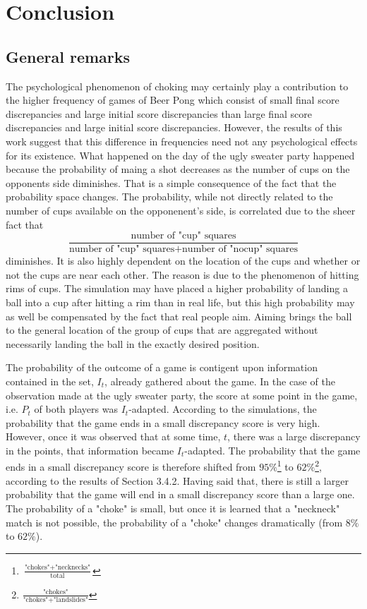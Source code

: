 \documentclass{article}
\begin{document}
\section{Conclusion}
\subsection{General remarks}
The psychological phenomenon of choking may certainly play a contribution to the higher frequency of games of Beer Pong which consist of small final score discrepancies and large initial score discrepancies than large final score discrepancies and large initial score discrepancies. However, the results of this work suggest that this difference in frequencies need not any psychological effects for its existence. What happened on the day of the ugly sweater party happened because the probability of maing a shot decreases as the number of cups on the opponents side diminishes. That is a simple consequence of the fact that the probability space changes. The probability, while not directly related to the number of cups available on the opponenent's side, is correlated due to the sheer fact that
\begin{equation}\label{sheerprob}
\frac{\text{number of "cup" squares}}{\text{number of "cup" squares} + \text{number of "nocup" squares}}
\end{equation}
diminishes. 
It is also highly dependent on the location of the cups and whether or not the cups are near each other. The reason is due to the phenomenon of hitting rims of cups. The simulation may have placed a higher probability of landing a ball into a cup after hitting a rim than in real life, but this high probability may as well be compensated by the fact that real people aim. Aiming brings the ball to the general location of the group of cups that are aggregated without necessarily landing the ball in the exactly desired position.

The probability of the outcome of a game is contigent upon information contained in the set, $I_t$, already gathered about the game. In the case of the observation made at the ugly sweater party, the score at some point in the game, i.e. $P_t$ of both players was $I_t$-adapted. According to the simulations, the probability that the game ends in a small discrepancy score is very high. However, once it was observed that at some time, $t$, there was a large discrepancy in the points, that information became $I_t$-adapted. The probability that the game ends in a small discrepancy score is therefore shifted from $95\%$\footnote{$\frac{\text{"chokes"} + \text{"necknecks"}}{\text{total}}$} to $62\%$\footnote{$\frac{\text{"chokes"}}{\text{"chokes"} + \text{"landslides"}}$}, according to the results of Section 3.4.2. Having said that, there is still a larger probability that the game will end in a small discrepancy score than a large one. The probability of a "choke" is small, but once it is learned that a "neckneck" match is not possible, the probability of a "choke" changes dramatically (from $8\%$ to $62\%$).
\end{document}
